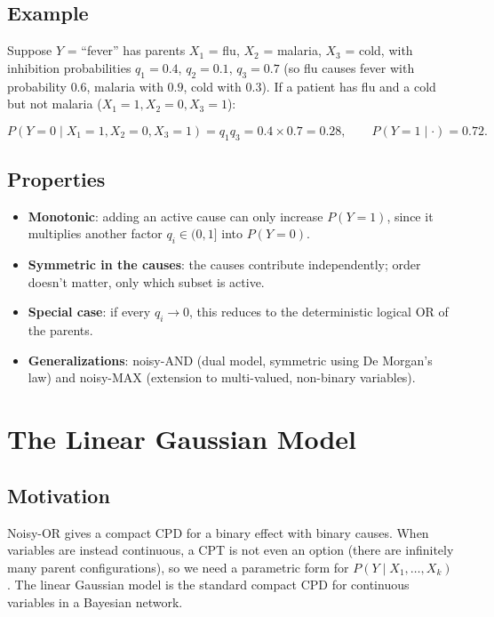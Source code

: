 \documentclass[11pt]{article}
\begin{document}
\subsection{Example}

Suppose $Y$ = ``fever'' has parents $X_1$ = flu, $X_2$ = malaria, $X_3$ = cold,
with inhibition probabilities $q_1 = 0.4$, $q_2 = 0.1$, $q_3 = 0.7$ (so flu causes
fever with probability $0.6$, malaria with $0.9$, cold with $0.3$). If a patient
has flu and a cold but not malaria ($X_1=1, X_2=0, X_3=1$):

\[
P(Y=0 \mid X_1=1, X_2=0, X_3=1) = q_1 q_3 = 0.4 \times 0.7 = 0.28,
\qquad P(Y=1 \mid \cdot) = 0.72 .
\]

\subsection{Properties}

\begin{itemize}
  \item \textbf{Monotonic}: adding an active cause can only increase $P(Y=1)$,
    since it multiplies another factor $q_i \in (0,1]$ into $P(Y=0)$.
  \item \textbf{Symmetric in the causes}: the causes contribute independently;
    order doesn't matter, only which subset is active.
  \item \textbf{Special case}: if every $q_i \to 0$, this reduces to the
    deterministic logical OR of the parents.
  \item \textbf{Generalizations}: noisy-AND (dual model, symmetric using De
    Morgan's law) and noisy-MAX (extension to multi-valued, non-binary
    variables).
\end{itemize}

\section{The Linear Gaussian Model}

\subsection{Motivation}

Noisy-OR gives a compact CPD for a binary effect with binary causes. When
variables are instead continuous, a CPT is not even an option (there are
infinitely many parent configurations), so we need a parametric form for
$P(Y \mid X_1, \dots, X_k)$. The linear Gaussian model is the standard compact
CPD for continuous variables in a Bayesian network.
\end{document}
